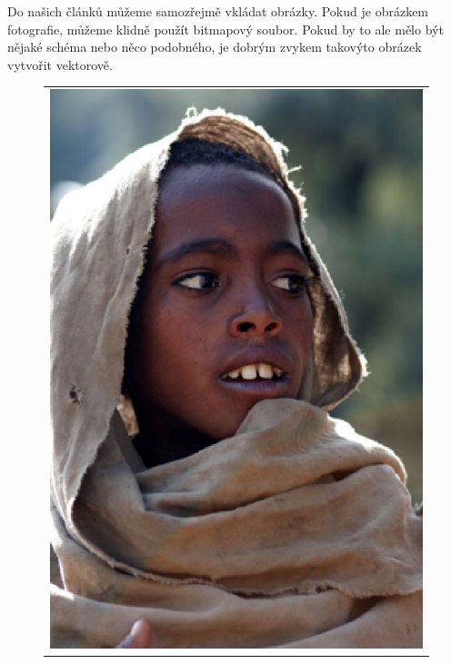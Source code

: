 \documentclass[11pt, ]{article}
\begin{document}
Do našich článků můžeme samozřejmě vkládat obrázky. Pokud je obrázkem fotografie,
můžeme klidně použít bitmapový soubor. Pokud by to ale mělo být nějaké schéma nebo
něco podobného, je dobrým zvykem takovýto obrázek vytvořit vektorově. 

\begin{figure}[h]
    \begin{center}
        \begin{tabular}{l}
            \includegraphics[scale=0.45]{pictures/etiopan.eps}

\end{tabular}
\end{center}
\end{figure}
\end{document}
